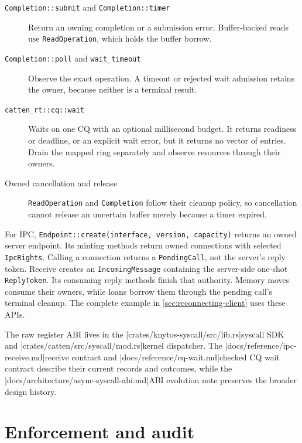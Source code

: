 \begin{description}
    \item[\texttt{Completion::submit} and \texttt{Completion::timer}]
        Return an owning completion or a submission error. Buffer-backed reads
        use \texttt{ReadOperation}, which holds the buffer borrow.
    \item[\texttt{Completion::poll} and \texttt{wait\_timeout}]
        Observe the exact operation. A timeout or rejected wait admission retains
        the owner, because neither is a terminal result.
    \item[\texttt{catten\_rt::cq::wait}]
        Waits on one CQ with an optional millisecond budget. It returns readiness
        or deadline, or an explicit wait error, but it returns no vector of entries.
        Drain the mapped ring separately and observe resources through their owners.
    \item[Owned cancellation and release]
        \texttt{ReadOperation} and \texttt{Completion} follow their cleanup policy, so
        cancellation cannot release an uncertain buffer merely because a timer expired.
\end{description}

For IPC, \texttt{Endpoint::create(interface, version, capacity)} returns an owned
server endpoint. Its minting methods return owned connections with selected
\texttt{IpcRights}. Calling a connection returns a \texttt{PendingCall}, not
the server's reply token. Receive creates an \texttt{IncomingMessage} containing
the server-side one-shot \texttt{ReplyToken}. Its consuming reply methods finish
that authority. Memory moves consume their owners, while loans borrow them through the
pending call's terminal cleanup. The complete example in
\autoref{sec:reconnecting-client} uses these APIs.

The raw register ABI lives in the
\repofiletext|crates/knytos-syscall/src/lib.rs|{syscall SDK} and
\repofiletext|crates/catten/src/syscall/mod.rs|{kernel dispatcher}. The
\repofiletext|docs/reference/ipc-receive.md|{receive contract} and
\repofiletext|docs/reference/cq-wait.md|{checked CQ wait contract} describe their
current records and outcomes, while the
\repofiletext|docs/architecture/async-syscall-abi.md|{ABI evolution note} preserves
the broader design history.

\section{Enforcement and audit}

